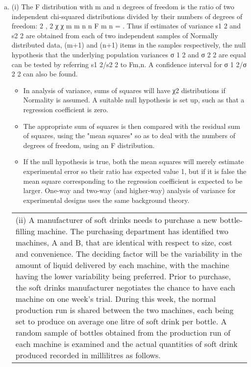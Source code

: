 \documentclass[a4paper,12pt]{article}
\begin{document}
\begin{enumerate}[(a)]
\item (i) The F distribution with m and n degrees of freedom is the ratio of two
independent chi-squared distributions divided by their numbers of degrees of
freedom:
2
, 2
χ
χ
m
m n
n
F m
n
= .
Thus if estimates of variance s1
2 and s2
2 are obtained from each of two
independent samples of Normally distributed data, (m+1) and (n+1) items in
the samples respectively, the null hypothesis that the underlying population
variances σ 1
2 and σ 2
2 are equal can be tested by referring s1
2/s2
2 to Fm,n. A
confidence interval for σ 1
2/σ 2
2 can also be found.
\begin{itemize}
    \item In analysis of variance, sums of squares will have χ2 distributions if Normality
is assumed. A suitable null hypothesis is set up, such as that a regression
coefficient is zero. 
\item The appropriate sum of squares is then compared with the
residual sum of squares, using the "mean squares" so as to deal with the
numbers of degrees of freedom, using an F distribution.
\item If the null hypothesis
is true, both the mean squares will merely estimate experimental error so their
ratio has expected value 1, but if it is false the mean square corresponding to
the regression coefficient is expected to be larger. One-way and two-way (and
higher-way) analysis of variance for experimental designs uses the same
background theory.
\end{itemize}

\newpage
\begin{table}[ht!]
 
\centering
 
\begin{tabular}{|p{15cm}|}
 
\hline  

 (ii) A manufacturer of soft drinks needs to purchase a new bottle-filling machine.  The purchasing department has identified two machines, A and B, that are identical with respect to size, cost and convenience.  The deciding factor will be the variability in the amount of liquid delivered by each machine, with the machine having the lower variability being preferred.  Prior to purchase, the soft drinks manufacturer negotiates the chance to have each machine on one week's trial.  During this week, the normal production run is shared between the two machines, each being set to produce on average one litre of soft drink per bottle.  A random sample of bottles obtained from the production run of each machine is examined and the actual quantities of soft drink produced recorded in millilitres as follows. 
 

\end{tabular}
\end{table}
\end{enumerate}
\end{document}

